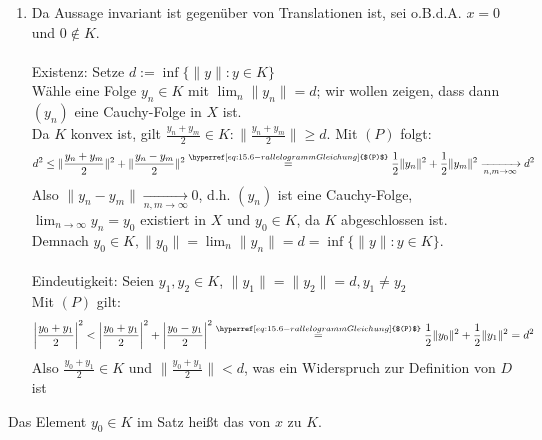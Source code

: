 \begin{beweis}
	\begin{enumerate}[label=\alph*\upshape)]
		\item Da Aussage invariant ist gegenüber von Translationen ist, sei o.B.d.A. $x = 0$ und $0 \notin K$. \\ \\
			Existenz: Setze $d := \inf \{ \| y \| : y \in K \}$ \\
			Wähle eine Folge $y_{n} \in K$ mit $\lim_{n} \| y_{n} \| = d$; wir wollen zeigen, dass dann $(y_{n})$ eine Cauchy-Folge in $X$ ist. \\
			Da $K$ konvex ist, gilt $\frac{y_{n} + y_{m}}{2} \in K: \| \frac{y_{n} + y_{m}}{2} \| \geq d$. Mit \hyperref[eq:15.6-rallelogrammGleichung]{$(P)$} folgt:
			\[ d^{2} \leq \| \frac{y_{n} + y_{m}}{2} \|^{2} + \| \frac{y_{n} - y_{m}}{2} \|^{2} \overset{\hyperref[eq:15.6-rallelogrammGleichung]{$(P)$}}{=} \frac{1}{2} \| y_{n} \|^{2} + \frac{1}{2} \| y_{m} \|^{2} \xrightarrow[n, m \rightarrow \infty]{} d^{2} \]
			Also $\| y_{n} - y_{m} \| \xrightarrow[n, m \rightarrow \infty]{} 0$, d.h. $(y_{n})$ ist eine Cauchy-Folge, $\lim_{n \rightarrow \infty} y_{n} = y_{0}$ existiert in $X$ und $y_{0} \in K$, da $K$ abgeschlossen ist. \\
			Demnach $y_{0} \in K, \| y_{0} \| = \lim_{n} \| y_{n} \| = d = \inf \{ \| y \| : y \in K \}$. \\ \\
			Eindeutigkeit: Seien $y_{1}, y_{2} \in K$, $\|y_{1} \| = \|y_{2} \| = d, y_{1} \neq y_{2}$ \\
			Mit \hyperref[eq:15.6-rallelogrammGleichung]{$(P)$} gilt:
			\[ \left| \frac{y_{0} + y_{1}}{2} \right|^{2} < \left| \frac{y_{0} + y_{1}}{2} \right|^{2} + \left| \frac{y_{0} - y_{1}}{2} \right|^{2} \overset{\hyperref[eq:15.6-rallelogrammGleichung]{$(P)$}}{=} \frac{1}{2} \| y_{0} \|^{2} + \frac{1}{2} \| y_{1} \|^{2} = d^{2} \]
			Also $\frac{y_{0} + y_{1}}{2} \in K$ und $ \| \frac{y_{0} + y_{1}}{2} \| < d$, was ein Widerspruch zur Definition von $D$ ist
	\end{enumerate}
\end{beweis}


\begin{vereinbarung}
	Das Element $y_{0} \in K$ im Satz hei{\ss}t das  von $x$ zu $K$.
\end{vereinbarung}



\newpage